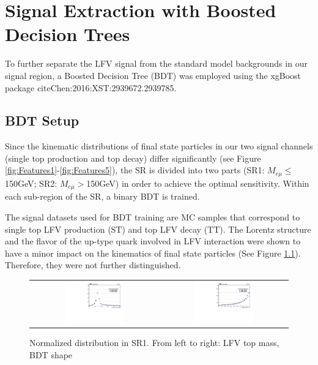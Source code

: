 \chapter{Signal Extraction with Boosted Decision Trees}
\label{chap:BDT}

To further separate the LFV signal from the standard model backgrounds in our signal region, a Boosted Decision Tree (BDT) was employed using the xgBoost package cite{Chen:2016:XST:2939672.2939785}. 
\section{BDT Setup}
\label{sec:Setup}

Since the kinematic distributions of final state particles in our two signal channels (single top production and top decay) differ significantly (see Figure \ref{fig:Features1}-\ref{fig:Features5}), the SR is divided into two parts (SR1: $M_{e\mu}\leq$150GeV; SR2: $M_{e\mu}>$150GeV) in order to achieve the optimal sensitivity. Within each sub-region of the SR, a binary BDT is trained.
   
The signal datasets used for BDT training are MC samples that correspond to single top LFV production (ST) and top LFV decay (TT). The Lorentz structure and the flavor of the up-type quark involved in LFV interaction were shown to have a minor impact on the kinematics of final state particles (See Figure \ref{fig:Lorentz}). Therefore, they were not further distinguished.  

\begin{figure}[tbh!]
 \begin{center}
 \begin{tabular}{cc}
  \includegraphics[width=0.48\textwidth]{figures/Part3/BDT/LFV_VR_emul_lllOffZMetg20Jetgeq1Bleq1_LFVTopmass_N}&
    \includegraphics[width=0.48\textwidth]{figures/Part3/BDT/LFV_VR_emul_lllOffZMetg20Jetgeq1Bleq1_BDT_TT_N}\\
 \end{tabular}
 \caption{Normalized distribution in SR1. From left to right: LFV top mass, BDT shape}
 \label{fig:Lorentz}
 \end{center}
\end{figure}

